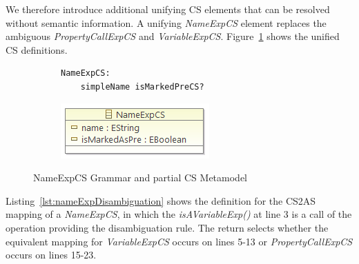\documentclass{llncs}
\begin{document}
We therefore introduce additional unifying CS elements that can be resolved without semantic information.  A unifying \emph{NameExpCS} element replaces the ambiguous \emph{PropertyCallExpCS} and \emph{VariableExpCS}.
Figure~\ref{fig:NameExpCS} shows the unified CS definitions.


\begin{figure}[htbp]
\centering
\begin{subfigure}{0.5\textwidth}
  \centering
 \begin{lstlisting}[label=lst:NameExpEBNF, language=Xtext]
 NameExpCS:
 	simpleName isMarkedPreCS?
 \end{lstlisting} 
\end{subfigure}%
\begin{subfigure}{0.5\textwidth}
  \centering
  \includegraphics[scale=0.75]{images/NameExpCS.png}
\end{subfigure}
\caption{NameExpCS Grammar and partial CS Metamodel}
\label{fig:NameExpCS}
\end{figure}

Listing~\ref{lst:nameExpDisambiguation} shows the definition for the CS2AS mapping of a \emph{NameExpCS}, in which the \emph{isAVariableExp()} at line 3 is a call of the operation providing the disambiguation rule. The return selects whether the equivalent mapping for \emph{VariableExpCS} occurs on lines 5-13 or \emph{PropertyCallExpCS} occurs on lines 15-23.

\end{document}
